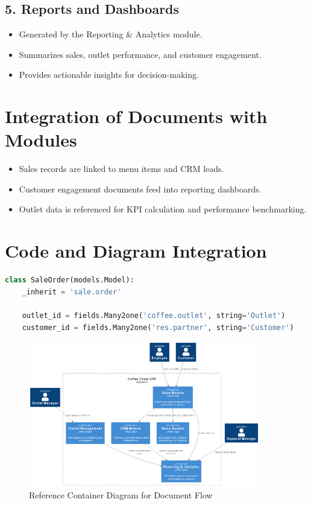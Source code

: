 \subsection*{5. Reports and Dashboards}
\begin{itemize}
    \item Generated by the Reporting \& Analytics module.
    \item Summarizes sales, outlet performance, and customer engagement.
    \item Provides actionable insights for decision-making.
\end{itemize}

\section*{Integration of Documents with Modules}

\begin{itemize}
    \item Sales records are linked to menu items and CRM leads.
    \item Customer engagement documents feed into reporting dashboards.
    \item Outlet data is referenced for KPI calculation and performance benchmarking.
\end{itemize}

\section*{Code and Diagram Integration}

\begin{lstlisting}[language=Python, caption={Example: Sales Transaction Recording in Python}]
class SaleOrder(models.Model):
    _inherit = 'sale.order'

    outlet_id = fields.Many2one('coffee.outlet', string='Outlet')
    customer_id = fields.Many2one('res.partner', string='Customer')
\end{lstlisting}

\begin{figure}[H]
\centering
\includegraphics[width=0.9\textwidth,keepaspectratio]{diagrams/C2.png}
\caption{Reference Container Diagram for Document Flow}
\end{figure}

